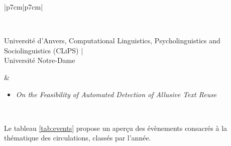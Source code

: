 \begin{table}[htbp]
{\begin{tabular}[t]{|p{7cm}|p{7cm}|}
\begin{minipage}[t]{\linewidth}
\begin{itemize}[leftmargin=*]
				\end{itemize}
			\end{minipage} \\ \hline
			\begin{minipage}[t]{\linewidth}
			Université d'Anvers, Computational Linguistics, Psycholinguistics and Sociolinguistics (\textsc{CLiPS}) |\\Université Notre-Dame
			\end{minipage} 
			& 
			\begin{minipage}[t]{\linewidth}
				\begin{itemize}[leftmargin=*]
					\item \textit{On the Feasibility of Automated Detection of Allusive Text Reuse} \citep{manjavacas}
				\end{itemize}
			\end{minipage} \\ \hline
		\end{tabular}%
	}
	\caption{Structures de recherche axées sur la thématique des circulations des savoirs.}
	\label{tab:equipes}
\end{table}



Le tableau \ref{tab:events} propose un aperçu des évènements consacrés à la thématique des circulations, classés par l'année. 


